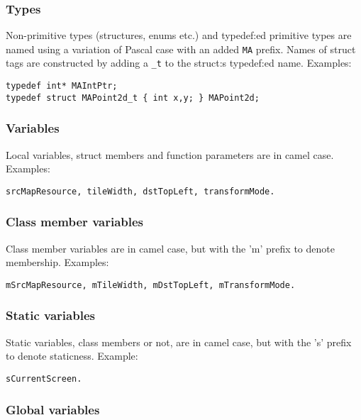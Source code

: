 \documentclass {article}
\begin{document}
\subsubsection{Types}

Non-primitive types (structures, enums etc.) and typedef:ed primitive types are named 
using a variation of Pascal case with an added \verb|MA| prefix. Names of struct tags 
are constructed by adding a \verb|_t| to the struct:s typedef:ed name. Examples:

\begin{verbatim}
typedef int* MAIntPtr;
typedef struct MAPoint2d_t { int x,y; } MAPoint2d;
\end{verbatim}

\subsubsection{Variables}

Local variables, struct members and function parameters are in camel case. Examples:

\begin{verbatim}
srcMapResource, tileWidth, dstTopLeft, transformMode.
\end{verbatim}

\subsubsection{Class member variables}

Class member variables are in camel case, but with the 'm' prefix to denote membership. Examples:

\begin{verbatim}
mSrcMapResource, mTileWidth, mDstTopLeft, mTransformMode.
\end{verbatim}

\subsubsection{Static variables}

Static variables, class members or not, are in camel case, but with the 's' prefix to denote staticness. Example:

\begin{verbatim}
sCurrentScreen.
\end{verbatim}

\subsubsection{Global variables}
\end{document}
